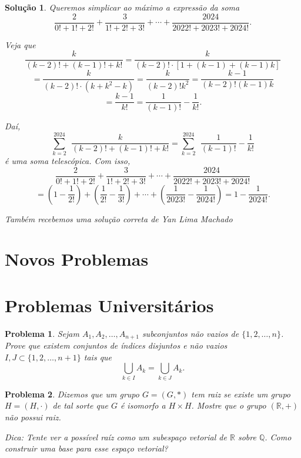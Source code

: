 \documentclass{hipatia}
\newtheorem{problem*}{Problema}
\newtheorem*{solution*}{Solução}
\begin{document}
\begin{solution*}
Queremos simplicar ao máximo a expressão da soma $$\frac{2}{0! + 1! + 2!} + \frac{3}{1! + 2! + 3!} + \cdots + \frac{2024}{2022! + 2023! + 2024!} .$$

Veja que $$\frac{k}{(k-2)! + (k-1)! + k!} = \frac{k}{(k-2)! \cdot [1 + (k-1) + (k-1)k]} $$ $$= \frac{k}{(k-2)! \cdot (k + k^2 - k)} = \frac{k}{(k-2)!k^2} = \frac{k-1}{(k-2)!(k-1)k} $$ $$= \frac{k-1}{k!} = \frac{1}{(k-1)!} - \frac{1}{k!}.$$

Daí, $$\sum_{k=2}^{2024} \ \ \frac{k}{(k-2)! + (k-1)! + k!} = \sum_{k=2}^{2024} \ \ \frac{1}{(k-1)!} - \frac{1}{k!}$$ é uma soma telescópica. Com isso, $$\frac{2}{0! + 1! + 2!} + \frac{3}{1! + 2! + 3!} + \cdots + \frac{2024}{2022! + 2023! + 2024!} $$ $$= \left( 1 - \frac{1}{2!} \right) + \left( \frac{1}{2!} - \frac{1}{3!} \right) + \cdots + \left( \frac{1}{2023!} - \frac{1}{2024!} \right) = 1 - \frac{1}{2024!}.$$

{\black \it Também recebemos uma solução correta de Yan Lima Machado}
\end{solution*}

\section{Novos Problemas}

\section{Problemas Universitários}

\begin{problem*}
Sejam $A_1, A_2, \ldots, A_{n+1}$ subconjuntos não vazios de $\{1,2,\ldots, n\}$. Prove que existem conjuntos de índices disjuntos e não vazios 
$I,J \subset \{1,2,\ldots, n+1\}$ tais que $$\displaystyle \bigcup_{k \in I} A_k = \bigcup_{k \in J} A_k.$$
\end{problem*}

\begin{problem*}
Dizemos que um grupo $G=(G,\ast)$ tem raiz se existe um grupo $H=(H,\cdot)$ de tal sorte que $G$ é isomorfo a $H \times H$. Mostre que o grupo $(\mathbb{R}, +)$ não possui raiz.

\noindent Dica: Tente ver a possível raíz como um subespaço vetorial de $\mathbb{R}$ sobre $\mathbb{Q}$. Como construir uma base para esse espaço vetorial?	

\end{problem*}
\end{document}
